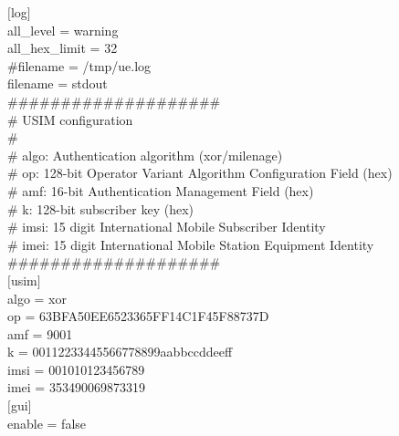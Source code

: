 $[$log$]$  \\
all\_level = warning  \\
all\_hex\_limit = 32  \\
\#filename = /tmp/ue.log  \\
filename = stdout  \\
  
\#\#\#\#\#\#\#\#\#\#\#\#\#\#\#\#\#\#\#\#  \\
\# USIM configuration  \\
\#  \\
\# algo: Authentication algorithm (xor/milenage)  \\
\# op:   128-bit Operator Variant Algorithm Configuration Field (hex)  \\
\# amf:  16-bit Authentication Management Field (hex)  \\
\# k:    128-bit subscriber key (hex)  \\
\# imsi: 15 digit International Mobile Subscriber Identity  \\
\# imei: 15 digit International Mobile Station Equipment Identity  \\
\#\#\#\#\#\#\#\#\#\#\#\#\#\#\#\#\#\#\#\#  \\

$[$usim$]$  \\
algo = xor  \\
op   = 63BFA50EE6523365FF14C1F45F88737D  \\
amf  = 9001  \\
k    = 00112233445566778899aabbccddeeff  \\
imsi = 001010123456789  \\
imei = 353490069873319  \\
  
$[$gui$]$  \\
enable = false  \\
  

